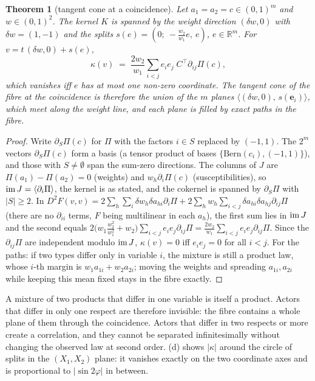 \documentclass[11pt]{article}
\newtheorem{theorem}{Theorem}\newtheorem{proposition}[theorem]{Proposition}\newtheorem{corollary}[theorem]{Corollary}
\theoremstyle{definition}\newtheorem{definition}[theorem]{Definition}\newtheorem{remark}[theorem]{Remark}\newtheorem{example}[theorem]{Example}
\newcommand{\R}{\mathbb R}
\newcommand{\Bern}{\mathrm{Bern}}
\begin{document}
\begin{theorem}[tangent cone at a coincidence]\label{thm:cone}
Let $a_1=a_2=c\in(0,1)^m$ and $w\in(0,1)^2$. The kernel $K$ is spanned by the weight direction $(\delta w,0)$ with $\delta w=(1,-1)$ and the
\emph{splits} $s(e)=(0;\ -\tfrac{w_2}{w_1}e,\ e)$, $e\in\R^m$. For $v=t\,(\delta w,0)+s(e)$,
\[
  \kappa(v) \;=\; \frac{2w_2}{w_1}\sum_{i<j} e_ie_j\; C^{\!\top}\partial_{ij}\Pi(c),
\]
which vanishes iff $e$ has at most one non-zero coordinate. The tangent cone of the fibre at the coincidence is therefore the union of
the $m$ planes $\langle(\delta w,0),\, s(\mathbf e_i)\rangle$, which meet along the weight line, and each plane is filled by exact paths in the
fibre.
\end{theorem}

\begin{proof}
Write $\partial_S\Pi(c)$ for $\Pi$ with the factors $i\in S$ replaced by $(-1,1)$. The $2^m$ vectors $\partial_S\Pi(c)$ form a basis
(a tensor product of bases $\{\Bern(c_i),(-1,1)\}$), and those with $S\neq\emptyset$ span the sum-zero directions. The columns of $J$ are
$\Pi(a_1)-\Pi(a_2)=0$ (weights) and $w_h\partial_i\Pi(c)$ (susceptibilities), so $\operatorname{im} J=\langle\partial_i\Pi\rangle$, the kernel is as
stated, and the cokernel is spanned by $\partial_S\Pi$ with $|S|\ge2$. In $D^2F(v,v)=2\sum_h\sum_i\delta w_h\delta a_{hi}\partial_i\Pi+
2\sum_h w_h\sum_{i<j}\delta a_{hi}\delta a_{hj}\partial_{ij}\Pi$ (there are no $\partial_{ii}$ terms, $F$ being multilinear in each
$a_h$), the first sum lies in $\operatorname{im} J$ and the second equals $2\big(w_1\tfrac{w_2^2}{w_1^2}+w_2\big)\sum_{i<j}e_ie_j\partial_{ij}\Pi=
\tfrac{2w_2}{w_1}\sum_{i<j}e_ie_j\partial_{ij}\Pi$. Since the $\partial_{ij}\Pi$ are independent modulo $\operatorname{im} J$, $\kappa(v)=0$ iff
$e_ie_j=0$ for all $i<j$. For the paths: if two types differ only in variable $i$, the mixture is still a product law, whose $i$-th margin is
$w_1a_{1i}+w_2a_{2i}$; moving the weights and spreading $a_{1i},a_{2i}$ while keeping this mean fixed stays in the fibre exactly.
\end{proof}

A mixture of two products that differ in one variable is itself a product. Actors that differ in only one respect are therefore
invisible: the fibre contains a whole plane of them through the coincidence. Actors that differ in two respects or more create a
correlation, and they cannot be separated infinitesimally without changing the observed law at second order. (d) shows
$|\kappa|$ around the circle of splits in the $(X_1,X_2)$ plane: it vanishes exactly on the two coordinate axes and is proportional to
$|\sin2\varphi|$ in between.
\end{document}
